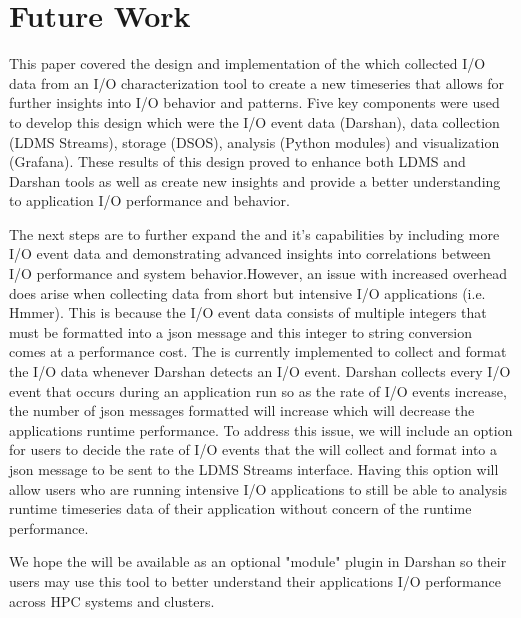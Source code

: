 \section{Future Work}
\label{sec:conclusion}
 This paper covered the \Darshan design and implementation of the \connector which collected I/O data from an I/O characterization tool to create a new timeseries that allows for further insights into I/O behavior and patterns. Five key components were used to develop this design which were the I/O event data (Darshan), data collection (LDMS Streams), storage (DSOS), analysis (Python modules) and visualization (Grafana).
These results of this design proved to enhance both LDMS and Darshan tools as well as create new insights and provide a better understanding to application I/O performance and behavior. 

The next steps are to further expand the \connector and it's capabilities by including more I/O event data and demonstrating advanced insights into correlations between I/O performance and system behavior.However, an issue with increased overhead does arise when collecting data from short but intensive I/O applications  (i.e. Hmmer). This is because the I/O event data consists of multiple integers that must be formatted into a json message and this integer to string conversion comes at a performance cost. The \connector is currently implemented to collect and format the I/O data whenever Darshan detects an I/O event. Darshan collects every I/O event that occurs during an application run so as the rate of I/O events increase, the number of json messages formatted will increase which will decrease the applications runtime performance. To address this issue, we will include an option for users to decide the rate of I/O events that the \connector will collect and format into a json message to be sent to the LDMS Streams interface. Having this option will allow users who are running intensive I/O applications to still be able to analysis runtime timeseries data of their application without concern of the runtime performance. 

We hope the \Darshan will be available as an optional "module" plugin in Darshan so their users may use this tool to better understand their applications I/O performance across HPC systems and clusters. 

